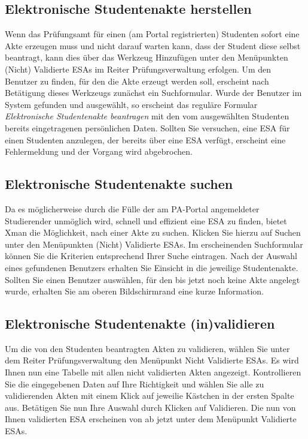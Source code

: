 \documentclass[a4paper,11pt]{article}
\newcommand{\knopf}[1]{{\sc #1}}
\begin{document}
\subsection{Elektronische Studentenakte herstellen}

Wenn das Prüfungsamt für einen (am Portal registrierten) Studenten sofort eine
Akte erzeugen muss und nicht darauf warten kann, dass der Student diese selbst
beantragt, kann dies über das Werkzeug \knopf{Hinzufügen} unter den
Menüpunkten \knopf{(Nicht) Validierte ESAs} im Reiter
\knopf{Prüfungsverwaltung} erfolgen. Um den Benutzer zu finden, für den die
Akte erzeugt werden soll, erscheint nach Betätigung dieses Werkzeugs zunächst
ein Suchformular. Wurde der Benutzer im System gefunden und ausgewählt, so
erscheint das reguläre Formular {\em Elektronische Studentenakte beantragen}
mit den vom ausgewählten Studenten bereits eingetragenen persönlichen Daten.
Sollten Sie versuchen, eine ESA für einen Studenten anzulegen, der bereits
über eine ESA verfügt, erscheint eine Fehlermeldung und der Vorgang wird
abgebrochen.

\subsection{Elektronische Studentenakte suchen}

Da es möglicherweise durch die Fülle der am PA-Portal angemeldeter Studierender
unmöglich wird, schnell und effizient eine ESA zu finden, bietet Xman die
Möglichkeit, nach einer Akte zu suchen. Klicken Sie hierzu auf \knopf{Suchen}
unter den Menüpunkten \knopf{(Nicht) Validierte ESAs}. Im erscheinenden
Suchformular können Sie die Kriterien entsprechend Ihrer Suche eintragen. Nach
der Auswahl eines gefundenen Benutzers erhalten Sie Einsicht in die jeweilige
Studentenakte. Sollten Sie einen Benutzer auswählen, für den bis jetzt noch
keine Akte angelegt wurde, erhalten Sie am oberen Bildschirmrand eine kurze
Information.

\subsection{Elektronische Studentenakte (in)validieren}

Um die von den Studenten beantragten Akten zu validieren, wählen Sie unter dem
Reiter \knopf{Prüfungsverwaltung} den Menüpunkt \knopf{Nicht Validierte ESAs}.
Es wird Ihnen nun eine Tabelle mit allen nicht validierten Akten angezeigt.
Kontrollieren Sie die eingegebenen Daten auf Ihre Richtigkeit und wählen Sie
alle zu validierenden Akten mit einem Klick auf jeweilie Kästchen in der
ersten Spalte aus. Betätigen Sie nun Ihre Auswahl durch Klicken auf
\knopf{Validieren}. Die nun von Ihnen validierten ESA erscheinen von ab jetzt
unter dem Menüpunkt \knopf{Validierte ESAs}.
\end{document}
